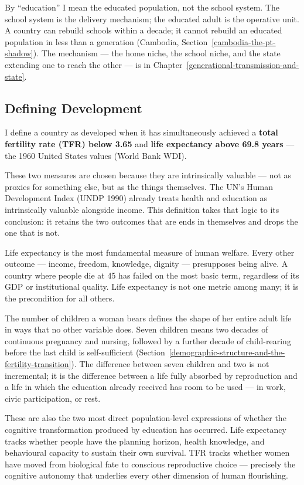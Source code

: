 \documentclass[12pt,letterpaper]{article}
\begin{document}
By ``education'' I mean the educated population, not the
school system. The school system is the delivery mechanism; the
educated adult is the operative unit. A country can rebuild schools
within a decade; it cannot rebuild an educated population in less than
a generation (Cambodia,
Section~\ref{cambodia-the-pt-shadow}). The mechanism --- the home
niche, the school niche, and the state extending one to reach the
other --- is in
Chapter~\ref{generational-transmission-and-state}.

\subsection{Defining Development}\label{defining-development}

I define a country as developed when it has simultaneously achieved a
\textbf{total fertility rate (TFR) below 3.65} and \textbf{life
expectancy above 69.8 years} --- the 1960 United States values (World
Bank WDI).

These two measures are chosen because they are intrinsically valuable
--- not as proxies for something else, but as the things themselves.
The UN's Human Development Index (UNDP 1990) already treats health
and education as intrinsically valuable alongside income. This
definition takes that logic to its conclusion: it retains the two
outcomes that are ends in themselves and drops the one that is not.

Life expectancy is the most fundamental measure of human welfare.
Every other outcome --- income, freedom, knowledge, dignity ---
presupposes being alive. A country where people die at 45 has failed
on the most basic term, regardless of its GDP or institutional
quality. Life expectancy is not one metric among many; it is the
precondition for all others.

The number of children a woman bears defines the shape of her entire
adult life in ways that no other variable does. Seven children means
two decades of continuous pregnancy and nursing, followed by a further
decade of child-rearing before the last child is self-sufficient
(Section~\ref{demographic-structure-and-the-fertility-transition}).
The difference between seven children and two is not incremental; it
is the difference between a life fully absorbed by reproduction and a
life in which the education already received has room to be used --- in
work, civic participation, or rest.

These are also the two most direct population-level expressions of
whether the cognitive transformation produced by education has
occurred. Life expectancy tracks whether people have the planning
horizon, health knowledge, and behavioural capacity to sustain their
own survival. TFR tracks whether women have moved from biological fate
to conscious reproductive choice --- precisely the cognitive autonomy
that underlies every other dimension of human flourishing.
\end{document}

